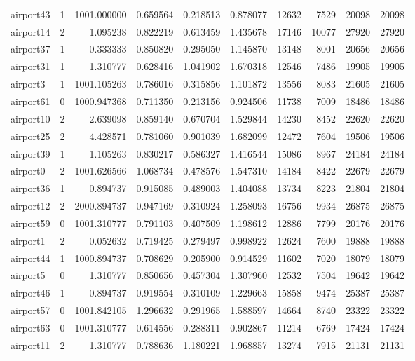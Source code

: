\begin{longtable}{|l|r|r|r|r|r|r|r|r|r|}
airport43 & 1 & 1001.000000 & 0.659564 & 0.218513 & 0.878077 & 12632 & 7529 & 20098 & 20098 \\
airport14 & 2 & 1.095238 & 0.822219 & 0.613459 & 1.435678 & 17146 & 10077 & 27920 & 27920 \\
airport37 & 1 & 0.333333 & 0.850820 & 0.295050 & 1.145870 & 13148 & 8001 & 20656 & 20656 \\
airport31 & 1 & 1.310777 & 0.628416 & 1.041902 & 1.670318 & 12546 & 7486 & 19905 & 19905 \\
airport3 & 1 & 1001.105263 & 0.786016 & 0.315856 & 1.101872 & 13556 & 8083 & 21605 & 21605 \\
airport61 & 0 & 1000.947368 & 0.711350 & 0.213156 & 0.924506 & 11738 & 7009 & 18486 & 18486 \\
airport10 & 2 & 2.639098 & 0.859140 & 0.670704 & 1.529844 & 14230 & 8452 & 22620 & 22620 \\
airport25 & 2 & 4.428571 & 0.781060 & 0.901039 & 1.682099 & 12472 & 7604 & 19506 & 19506 \\
airport39 & 1 & 1.105263 & 0.830217 & 0.586327 & 1.416544 & 15086 & 8967 & 24184 & 24184 \\
airport0 & 2 & 1001.626566 & 1.068734 & 0.478576 & 1.547310 & 14184 & 8422 & 22679 & 22679 \\
airport36 & 1 & 0.894737 & 0.915085 & 0.489003 & 1.404088 & 13734 & 8223 & 21804 & 21804 \\
airport12 & 2 & 2000.894737 & 0.947169 & 0.310924 & 1.258093 & 16756 & 9934 & 26875 & 26875 \\
airport59 & 0 & 1001.310777 & 0.791103 & 0.407509 & 1.198612 & 12886 & 7799 & 20176 & 20176 \\
airport1 & 2 & 0.052632 & 0.719425 & 0.279497 & 0.998922 & 12624 & 7600 & 19888 & 19888 \\
airport44 & 1 & 1000.894737 & 0.708629 & 0.205900 & 0.914529 & 11602 & 7020 & 18079 & 18079 \\
airport5 & 0 & 1.310777 & 0.850656 & 0.457304 & 1.307960 & 12532 & 7504 & 19642 & 19642 \\
airport46 & 1 & 0.894737 & 0.919554 & 0.310109 & 1.229663 & 15858 & 9474 & 25387 & 25387 \\
airport57 & 0 & 1001.842105 & 1.296632 & 0.291965 & 1.588597 & 14664 & 8740 & 23322 & 23322 \\
airport63 & 0 & 1001.310777 & 0.614556 & 0.288311 & 0.902867 & 11214 & 6769 & 17424 & 17424 \\
airport11 & 2 & 1.310777 & 0.788636 & 1.180221 & 1.968857 & 13274 & 7915 & 21131 & 21131 \\

\end{longtable}
